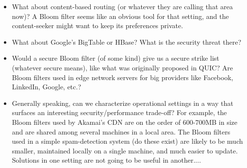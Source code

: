 \begin{itemize}
\item What about content-based routing (or whatever they are calling that area now)?  A Bloom filter seems like an obvious tool for that setting, and the content-seeker might want to keep its preferences private.

\item What about Google's BigTable or HBase?  What is the security threat there?

\item Would a secure Bloom filter (of some kind) give us a secure strike list (whatever secure means), like what was originally proposed in QUIC?  Are Bloom filters used in edge network servers for big providers like Facebook, LinkedIn, Google, etc.?

\item Generally speaking, can we characterize operational settings in a way that surfaces an interesting security/performance trade-off?  For example, the Bloom filters used by Akamai's CDN are on the order of 600-700MB in size and are shared among several machines in a local area.  The Bloom filters used in a simple spam-detection system (do these exist) are likely to be much smaller, maintained locally on a single machine, and much easier to update.  Solutions in one setting are not going to be useful in another....

\end{itemize}